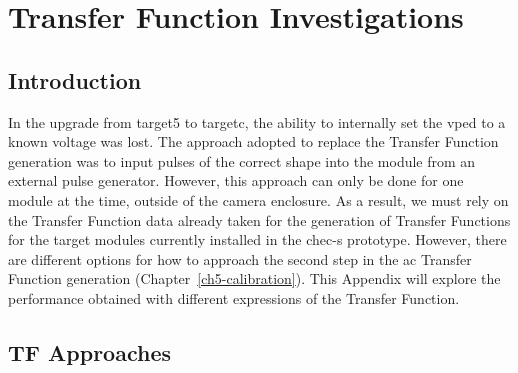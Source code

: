 \chapter{\label{a4-tf}Transfer Function Investigations}

\minitoc


\section{Introduction}

In the upgrade from \gls{target5} to \gls{targetc}, the ability to internally set the \gls{vped} to a known voltage was lost. The approach adopted to replace the Transfer Function generation was to input pulses of the correct shape into the module from an external pulse generator. However, this approach can only be done for one module at the time, outside of the camera enclosure. As a result, we must rely on the Transfer Function data already taken for the generation of Transfer Functions for the \gls{target} modules currently installed in the \gls{chec-s} prototype. However, there are different options for how to approach the second step in the \gls{ac} Transfer Function generation (Chapter~\ref{ch5-calibration}). This Appendix will explore the performance obtained with different expressions of the Transfer Function.

\section{TF Approaches}

